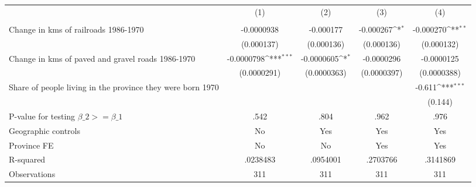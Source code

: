 {
\def\sym#1{\ifmmode^{#1}\else\(^{#1}\)\fi}
\begin{tabular}{l*{4}{c}}
\hline\hline
                &\multicolumn{1}{c}{(1)}&\multicolumn{1}{c}{(2)}&\multicolumn{1}{c}{(3)}&\multicolumn{1}{c}{(4)}\\
                &\multicolumn{1}{c}{}&\multicolumn{1}{c}{}&\multicolumn{1}{c}{}&\multicolumn{1}{c}{}\\
\hline
Change in kms of railroads 1986-1970&-0.0000938         &-0.000177         &-0.000267\sym{*}  &-0.000270\sym{**} \\
                &(0.000137)         &(0.000136)         &(0.000136)         &(0.000132)         \\
[1em]
Change in kms of paved and gravel roads 1986-1970&-0.0000798\sym{***}&-0.0000605\sym{*}  &-0.0000296         &-0.0000125         \\
                &(0.0000291)         &(0.0000363)         &(0.0000397)         &(0.0000388)         \\
[1em]
Share of people living in the province they were born 1970&                  &                  &                  &   -0.611\sym{***}\\
                &                  &                  &                  &  (0.144)         \\
\hline
P-value for testing $\beta\_{2} >= \beta\_{1}$&     .542         &     .804         &     .962         &     .976         \\
Geographic controls&       No         &      Yes         &      Yes         &      Yes         \\
Province FE     &       No         &       No         &      Yes         &      Yes         \\
R-squared       & .0238483         & .0954001         & .2703766         & .3141869         \\
Observations    &      311         &      311         &      311         &      311         \\
\hline\hline
\end{tabular}
}
